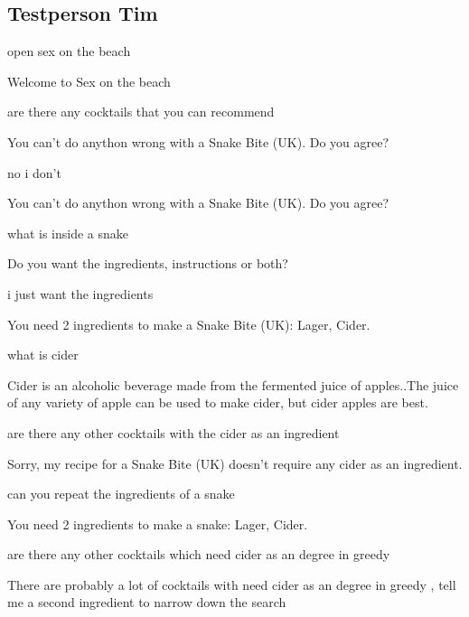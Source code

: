 \documentclass[12pt,letterpaper]{article}
\begin{document}
\subsection{Testperson Tim}
\begin{dialogue}

open sex on the beach

 Welcome to Sex on the beach

 are there any cocktails that you can recommend

 You can't do anython wrong with a Snake Bite (UK). Do you agree?

 no i don't

 You can't do anython wrong with a Snake Bite (UK). Do you agree?

 what is inside a snake

 Do you want the ingredients, instructions or both?

 i just want the ingredients

 You need 2 ingredients to make a Snake Bite (UK): Lager, Cider.

 what is cider

 Cider is an alcoholic beverage made from the fermented juice of apples..The juice of any variety of apple can be used to make cider, but cider apples are best.

 are there any other cocktails with the cider as an ingredient

 Sorry, my recipe for a Snake Bite (UK) doesn't require any cider as an ingredient.\\

 can you repeat the ingredients of a snake

 You need 2 ingredients to make a snake: Lager, Cider.

 are there any other cocktails which need cider as an degree in greedy

 There are probably a lot of cocktails with need cider as an degree in greedy , tell me a second ingredient to narrow down the search


\end{dialogue}
\end{document}
